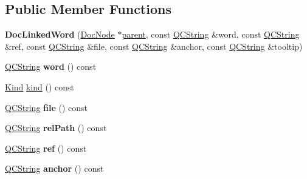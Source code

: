 \subsection*{Public Member Functions}
\begin{DoxyCompactItemize}
\item 
\mbox{\label{class_doc_linked_word_a95fe3314f15756695072183c9d0f28c1}} 
{\bfseries Doc\+Linked\+Word} (\mbox{\hyperlink{class_doc_node}{Doc\+Node}} $\ast$\mbox{\hyperlink{class_doc_node_a73e8ad29a91cfceb0968eb00db71a23d}{parent}}, const \mbox{\hyperlink{class_q_c_string}{Q\+C\+String}} \&word, const \mbox{\hyperlink{class_q_c_string}{Q\+C\+String}} \&ref, const \mbox{\hyperlink{class_q_c_string}{Q\+C\+String}} \&file, const \mbox{\hyperlink{class_q_c_string}{Q\+C\+String}} \&anchor, const \mbox{\hyperlink{class_q_c_string}{Q\+C\+String}} \&tooltip)
\item 
\mbox{\label{class_doc_linked_word_a99a9908a9068fadb25871975cc41a507}} 
\mbox{\hyperlink{class_q_c_string}{Q\+C\+String}} {\bfseries word} () const
\item 
\mbox{\hyperlink{class_doc_node_aebd16e89ca590d84cbd40543ea5faadb}{Kind}} \mbox{\hyperlink{class_doc_linked_word_aef22b3a37583c764a6be0ed1a1ff6dd5}{kind}} () const
\item 
\mbox{\label{class_doc_linked_word_a87a6514222a5dc65f0fe4420c916d3be}} 
\mbox{\hyperlink{class_q_c_string}{Q\+C\+String}} {\bfseries file} () const
\item 
\mbox{\label{class_doc_linked_word_a883e214d9c8dd9bca32c656d98fc5e76}} 
\mbox{\hyperlink{class_q_c_string}{Q\+C\+String}} {\bfseries rel\+Path} () const
\item 
\mbox{\label{class_doc_linked_word_a956ecf12c5e819f4cb3d1d742e0779c2}} 
\mbox{\hyperlink{class_q_c_string}{Q\+C\+String}} {\bfseries ref} () const
\item 
\mbox{\label{class_doc_linked_word_aa660e6600aa99dc591e1c7cc915f6d7c}} 
\mbox{\hyperlink{class_q_c_string}{Q\+C\+String}} {\bfseries anchor} () const
\item 
\mbox{\label{class_doc_linked_word_aff9702f0cf6d229a6eebf14352636a5f}} 

\end{DoxyCompactItemize}

